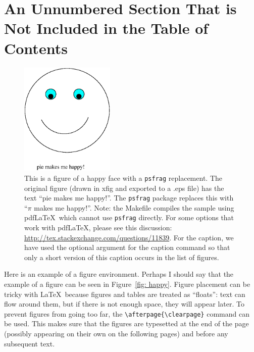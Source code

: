 \documentclass[msc,oneside]{ubcthesis}
\theoremstyle{definition}
\begin{document}
\section*{An Unnumbered Section That is Not Included in the Table of
  Contents}
\begin{figure}[ht]
  \begin{center}
    \includegraphics[width=0.4\textwidth]{fig}
    \caption[Happy Face: figure example.]{\label{fig:happy} This is a figure of
      a happy face with a \texttt{psfrag} replacement.  The original figure
      (drawn in xfig and exported to a .eps file) has the text ``pie makes me
      happy!''.  The \texttt{psfrag} package replaces this with ``$\pi$ makes me
      happy!''.  Note: the Makefile compiles the sample using pdf\LaTeX\ which
      cannot use \texttt{psfrag} directly.  For some options that work with
      pdf\LaTeX, please see this discussion:
      \url{http://tex.stackexchange.com/questions/11839}.  For the caption, we
      have used the optional argument for the caption command so that only a
      short version of this caption occurs in the list of figures.}
  \end{center}
\end{figure}
\afterpage{\clearpage}
Here is an example of a figure environment.
Perhaps I should say that the example of a figure can be seen in
Figure~\ref{fig: happy}.  Figure placement can be tricky with \LaTeX\
because figures and tables are treated as ``floats'': text can flow
around them, but if there is not enough space, they will appear later.
To prevent figures from going too far, the
\verb|\afterpage{\clearpage}| command can be used.  This makes sure
that the figures are typesetted at the end of the page (possibly appearing on
their own on the following pages) and before any subsequent text.
\end{document}
